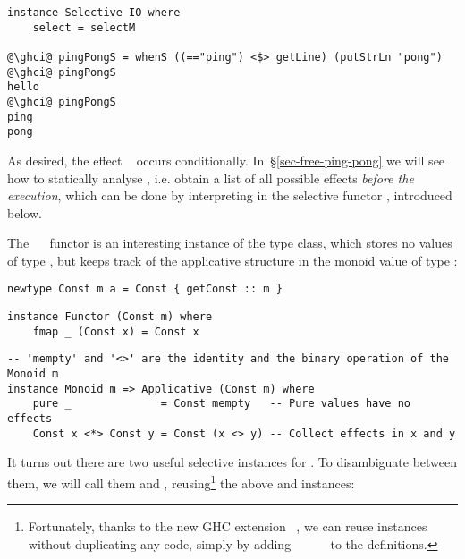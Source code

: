 {\vspace{1mm}
\begin{verbatim}
instance Selective IO where
    select = selectM

@\ghci@ pingPongS = whenS ((=="ping") <$> getLine) (putStrLn "pong")
@\ghci@ pingPongS
hello
@\ghci@ pingPongS
ping
pong
\end{verbatim}
\vspace{1mm}

\noindent
As desired, the effect ~ occurs conditionally.
In~\S\ref{sec-free-ping-pong} we will see how to statically analyse
, i.e. obtain a list of all possible effects \emph{before the
execution}, which can be done by interpreting  in the selective
functor , introduced below.

The ~~ functor is an interesting instance of the
 type class, which stores no values of type , but keeps
track of the applicative structure in the monoid value of type :

\vspace{1mm}
\begin{verbatim}
newtype Const m a = Const { getConst :: m }
\end{verbatim}
\vspace{1mm}
\begin{verbatim}
instance Functor (Const m) where
    fmap _ (Const x) = Const x
\end{verbatim}
\vspace{1mm}
\begin{verbatim}
-- 'mempty' and '<>' are the identity and the binary operation of the Monoid m
instance Monoid m => Applicative (Const m) where
    pure _              = Const mempty   -- Pure values have no effects
    Const x <*> Const y = Const (x <> y) -- Collect effects in x and y
\end{verbatim}
\vspace{1mm}

\noindent
It turns out there are two useful selective instances for . To
disambiguate between them, we will call them  and ,
reusing\footnote{Fortunately, thanks to the new GHC extension
~\citep{blondal2018deriving}, we can reuse 
instances without duplicating any code, simply by adding
~~~~~ to
the  definitions.}
the above  and  instances:

}
